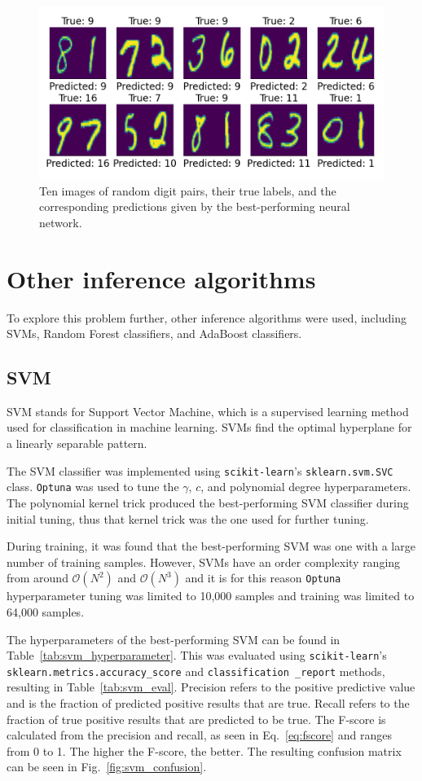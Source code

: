 \documentclass[11pt,a4paper]{article}
\begin{document}
\begin{figure}[ht]
    \centering
    \includegraphics[width=\columnwidth, keepaspectratio]{../nn_predictions.png}
    \caption{Ten images of random digit pairs, their true labels, and the corresponding predictions given by the best-performing neural network.}\label{fig:nn_predict}
\end{figure}

\clearpage
\section{Other inference algorithms}
To explore this problem further, other inference algorithms were used, including SVMs, Random Forest classifiers, and AdaBoost classifiers.
\subsection{SVM}
SVM stands for Support Vector Machine, which is a supervised learning method used for classification in machine learning. SVMs find the optimal hyperplane for a linearly separable pattern.

The SVM classifier was implemented using \texttt{scikit-learn}'s \texttt{sklearn.svm.SVC} class. \texttt{Optuna} was used to tune the $\gamma$, $c$, and polynomial degree hyperparameters. The polynomial kernel trick produced the best-performing SVM classifier during initial tuning, thus that kernel trick was the one used for further tuning.

During training, it was found that the best-performing SVM was one with a large number of training samples. However, SVMs have an order complexity ranging from around $\mathcal{O}(N^2)$ and $\mathcal{O}(N^3)$ and it is for this reason \texttt{Optuna} hyperparameter tuning was limited to 10,000 samples and training was limited to 64,000 samples.

The hyperparameters of the best-performing SVM can be found in Table~\ref{tab:svm_hyperparameter}. This was evaluated using \texttt{scikit-learn}'s \texttt{sklearn.metrics.accuracy\_score} and \texttt{classification \_report} methods, resulting in Table~\ref{tab:svm_eval}. Precision refers to the positive predictive value and is the fraction of predicted positive results that are true. Recall refers to the fraction of true positive results that are predicted to be true. The F-score is calculated from the precision and recall, as seen in Eq.~\ref{eq:fscore} and ranges from 0 to 1. The higher the F-score, the better. The resulting confusion matrix can be seen in Fig.~\ref{fig:svm_confusion}.
\end{document}
